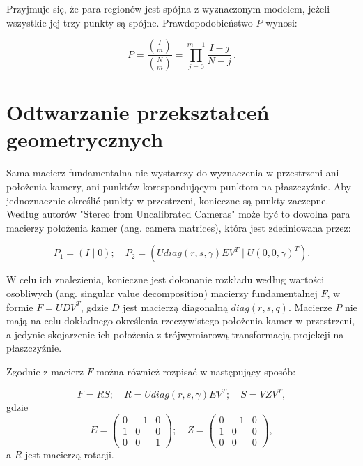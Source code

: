 Przyjmuje się, że para regionów jest spójna z wyznaczonym modelem, jeżeli
wszystkie jej trzy punkty są spójne. Prawdopodobieństwo $P$ wynosi: 

\begin{equation} P = \frac{{I \choose m}}{{N \choose m}} =
  \prod_{j=0}^{m-1}\frac{I - j}{N-j} \,.  \end{equation}

\section{Odtwarzanie przekształceń geometrycznych}

Sama macierz fundamentalna nie wystarczy do wyznaczenia w przestrzeni ani
położenia kamery, ani punktów korespondującym punktom na płaszczyźnie. Aby
jednoznacznie określić punkty w przestrzeni, konieczne są punkty zaczepne.
Według autorów "Stereo from Uncalibrated Cameras" \cite{stereo} może być to
dowolna para macierzy położenia kamer (ang. camera matrices), która jest
zdefiniowana przez:

\begin{equation}
  P_1 = (I\; |\; 0);\quad P_2 = (U diag(r,s,\gamma) E V^T\; |\; U(0,0,\gamma)^T).
\end{equation}

W celu ich znalezienia, konieczne jest dokonanie rozkładu według wartości
osobliwych (ang. singular value decomposition) macierzy fundamentalnej $F$, w
formie $F = UDV^T$, gdzie $D$ jest macierzą diagonalną $diag(r,s,q)$. Macierze
$P$ nie mają na celu dokładnego określenia rzeczywistego położenia kamer w
przestrzeni, a jedynie skojarzenie ich położenia z trójwymiarową transformacją
projekcji na płaszczyźnie.

Zgodnie z \cite{stereo} macierz $F$ można również rozpisać w następujący sposób:

\begin{equation}
  F = RS;\quad R = Udiag(r,s,\gamma)EV^T;\quad S = VZV^T ,
\end{equation}
gdzie 
\begin{equation}
  E = \begin{pmatrix} 
    0 &-1 & 0 \\
    1 & 0 & 0 \\
    0 & 0 & 1
  \end{pmatrix}
  ;\quad
  Z = \begin{pmatrix} 
    0 &-1 & 0 \\
    1 & 0 & 0 \\
    0 & 0 & 0
  \end{pmatrix},
\end{equation}
a $R$ jest macierzą rotacji.


